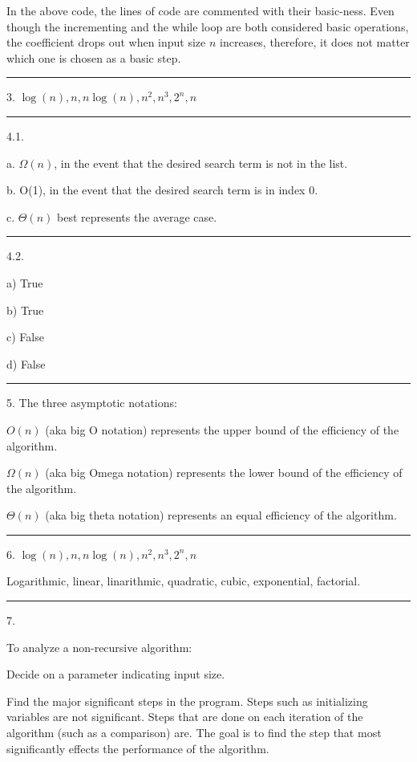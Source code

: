 \documentclass{article}
\begin{document}
In the above code, the lines of code are commented with their basic-ness. Even though the incrementing and the while loop are both considered basic operations, the coefficient drops out when input size $n$ increases, therefore, it does not matter which one is chosen as a basic step. 

\noindent\rule{8cm}{0.4pt}

3. $\log (n), n, n\log (n), n^2, n^3, 2^n, n\!$

\noindent\rule{8cm}{0.4pt}


4.1.

a. $\Omega(n)$, in the event that the desired search term is not in the list. 
	
b. O(1), in the event that the desired search term is in index 0. 

c. $\Theta(n)$ best represents the average case. 

\noindent\rule{2cm}{0.4pt}

4.2.

a) True

b) True

c) False

d) False


\noindent\rule{8cm}{0.4pt}

5. The three asymptotic notations:

$O(n)$ (aka big O notation) represents the upper bound of the efficiency of the algorithm.

$\Omega(n)$ (aka big Omega notation) represents the lower bound of the efficiency of the algorithm. 

$\Theta(n)$ (aka big theta notation) represents an equal efficiency of the algorithm. 



\noindent\rule{8cm}{0.4pt}


6.  $\log (n), n, n\log (n), n^2, n^3, 2^n, n\!$

	Logarithmic, linear, linarithmic, quadratic, cubic, exponential, factorial. 

\noindent\rule{8cm}{0.4pt}

7.  

To analyze a non-recursive algorithm:

Decide on a parameter indicating input size. 

Find the major significant steps in the program. Steps such as initializing variables are not significant. Steps that are done on each iteration of the algorithm (such as a comparison) are. The goal is to find the step that most significantly effects the performance of the algorithm. 
\end{document}
